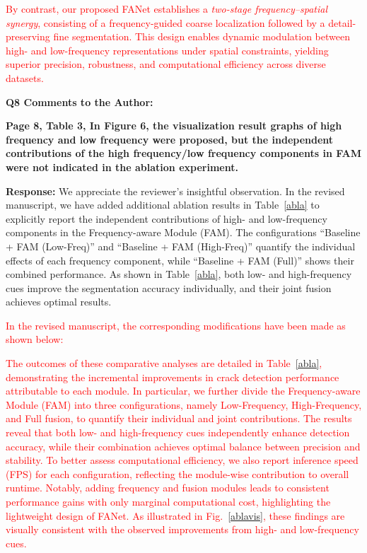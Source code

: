 \documentclass[lettersize,journal,onecolumn,12pt]{IEEEtran}
\begin{document}
\textcolor{red}{
By contrast, our proposed FANet establishes a \emph{two-stage frequency–spatial synergy}, consisting of a frequency-guided coarse localization followed by a detail-preserving fine segmentation. 
This design enables dynamic modulation between high- and low-frequency representations under spatial constraints, yielding superior precision, robustness, and computational efficiency across diverse datasets.
}\\ [10pt]







{\color{BlueGreen} \textbf{Q8 Comments to the Author:}

\textbf{Page 8, Table 3, In Figure 6, the visualization result graphs of high frequency and low frequency were proposed, but the independent contributions of the high frequency/low frequency components in FAM were not indicated in the ablation experiment.}} 

\textbf{Response:} 
We appreciate the reviewer’s insightful observation. 
In the revised manuscript, we have added additional ablation results in Table~\ref{abla} to explicitly report the independent contributions of high- and low-frequency components in the Frequency-aware Module (FAM). 
The configurations “Baseline + FAM (Low-Freq)” and “Baseline + FAM (High-Freq)” quantify the individual effects of each frequency component, while “Baseline + FAM (Full)” shows their combined performance. 
As shown in Table~\ref{abla}, both low- and high-frequency cues improve the segmentation accuracy individually, and their joint fusion achieves optimal results. 

\textcolor{red}{In the revised manuscript, the corresponding modifications have been made as shown below:}







\textcolor{red}{The outcomes of these comparative analyses are detailed in Table~\ref{abla}, demonstrating the incremental improvements in crack detection performance attributable to each module.}
\textcolor{red}{
In particular, we further divide the Frequency-aware Module (FAM) into three configurations, namely Low-Frequency, High-Frequency, and Full fusion, to quantify their individual and joint contributions.
The results reveal that both low- and high-frequency cues independently enhance detection accuracy, while their combination achieves optimal balance between precision and stability.
To better assess computational efficiency, we also report inference speed (FPS) for each configuration, reflecting the module-wise contribution to overall runtime.
Notably, adding frequency and fusion modules leads to consistent performance gains with only marginal computational cost, highlighting the lightweight design of FANet.}
\textcolor{red}{As illustrated in Fig.~\ref{ablavis}, these findings are visually consistent with the observed improvements from high- and low-frequency cues.}\\ [10pt]
\end{document}
